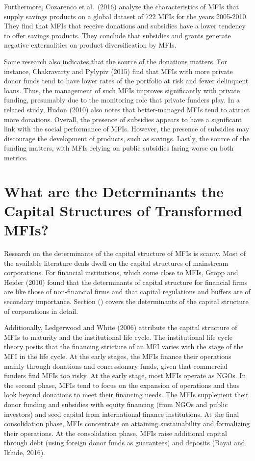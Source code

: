 \documentclass[a4paper, nobind]{templates/ociamthesis}
\begin{document}
Furthermore, Cozarenco et al.~(2016) analyze the characteristics of MFIs that supply savings products on a global dataset of 722 MFIs for the years 2005-2010. They find that MFIs that receive donations and subsidies have a lower tendency to offer savings products. They conclude that subsidies and grants generate negative externalities on product diversification by MFIs.

Some research also indicates that the source of the donations matters. For instance, Chakravarty and Pylypiv (2015) find that MFIs with more private donor funds tend to have lower rates of the portfolio at risk and fewer delinquent loans. Thus, the management of such MFIs improves significantly with private funding, presumably due to the monitoring role that private funders play. In a related study, Hudon (2010) also notes that better-managed MFIs tend to attract more donations. Overall, the presence of subsidies appears to have a significant link with the social performance of MFIs. However, the presence of subsidies may discourage the development of products, such as savings. Lastly, the source of the funding matters, with MFIs relying on public subsidies faring worse on both metrics.

\hypertarget{what-are-the-determinants-the-capital-structures-of-transformed-mfis}{%
\section{What are the Determinants the Capital Structures of Transformed MFIs?}\label{what-are-the-determinants-the-capital-structures-of-transformed-mfis}}

Research on the determinants of the capital structure of MFIs is scanty. Most of the available literature deals dwell on the capital structures of mainstream corporations. For financial institutions, which come close to MFIs, Gropp and Heider (2010) found that the determinants of capital structure for financial firms are like those of non-financial firms and that capital regulations and buffers are of secondary importance. Section () covers the determinants of the capital structure of corporations in detail.

Additionally, Ledgerwood and White (2006) attribute the capital structure of MFIs to maturity and the institutional life cycle. The institutional life cycle theory posits that the financing stricture of an MFI varies with the stage of the MFI in the life cycle. At the early stages, the MFIs finance their operations mainly through donations and concessionary funds, given that commercial funders find MFIs too risky. At the early stage, most MFIs operate as NGOs. In the second phase, MFIs tend to focus on the expansion of operations and thus look beyond donations to meet their financing needs. The MFIs supplement their donor funding and subsidies with equity financing (from NGOs and public investors) and seed capital from international finance institutions. At the final consolidation phase, MFIs concentrate on attaining sustainability and formalizing their operations. At the consolidation phase, MFIs raise additional capital through debt (using foreign donor funds as guarantees) and deposits (Bayai and Ikhide, 2016).
\end{document}
